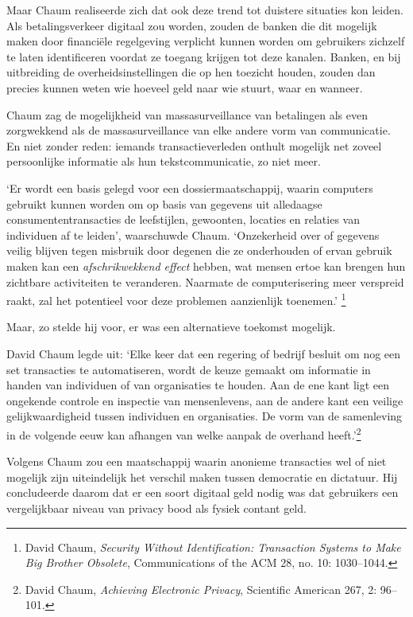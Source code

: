 \documentclass[
  a5paper,
  smalldemyvopaper,11pt,twoside,onecolumn,openright,extrafontsizes,
hidelinks]{memoir}
\begin{document}
Maar Chaum realiseerde zich dat ook deze trend tot duistere situaties
kon leiden. Als betalingsverkeer digitaal zou worden, zouden de banken
die dit mogelijk maken door financiële regelgeving verplicht kunnen
worden om gebruikers zichzelf te laten identificeren voordat ze toegang
krijgen tot deze kanalen. Banken, en bij uitbreiding de
overheidsinstellingen die op hen toezicht houden, zouden dan precies
kunnen weten wie hoeveel geld naar wie stuurt, waar en wanneer.

Chaum zag de mogelijkheid van massasurveillance van betalingen als even
zorgwekkend als de massasurveillance van elke andere vorm van
communicatie. En niet zonder reden: iemands transactieverleden onthult
mogelijk net zoveel persoonlijke informatie als hun tekstcommunicatie,
zo niet meer.

`Er wordt een basis gelegd voor een dossiermaatschappij, waarin
computers gebruikt kunnen worden om op basis van gegevens uit alledaagse
consumententransacties de leefstijlen, gewoonten, locaties en relaties
van individuen af te leiden', waarschuwde Chaum. `Onzekerheid over of
gegevens veilig blijven tegen misbruik door degenen die ze onderhouden
of ervan gebruik maken kan een \emph{afschrikwekkend effect} hebben, wat
mensen ertoe kan brengen hun zichtbare activiteiten te veranderen.
Naarmate de computerisering meer verspreid raakt, zal het potentieel
voor deze problemen aanzienlijk toenemen.' \footnote{David Chaum,
  \emph{Security Without Identification: Transaction Systems to Make Big
  Brother Obsolete}, Communications of the ACM 28, no. 10: 1030--1044.}

Maar, zo stelde hij voor, er was een alternatieve toekomst mogelijk.

David Chaum legde uit: `Elke keer dat een regering of bedrijf besluit om
nog een set transacties te automatiseren, wordt de keuze gemaakt om
informatie in handen van individuen of van organisaties te houden. Aan
de ene kant ligt een ongekende controle en inspectie van mensenlevens,
aan de andere kant een veilige gelijkwaardigheid tussen individuen en
organisaties. De vorm van de samenleving in de volgende eeuw kan
afhangen van welke aanpak de overhand heeft.'\footnote{David Chaum,
  \emph{Achieving Electronic Privacy}, Scientific American 267, 2:
  96--101.}

Volgens Chaum zou een maatschappij waarin anonieme transacties wel of
niet mogelijk zijn uiteindelijk het verschil maken tussen democratie en
dictatuur. Hij concludeerde daarom dat er een soort digitaal geld nodig
was dat gebruikers een vergelijkbaar niveau van privacy bood als fysiek
contant geld.
\end{document}
